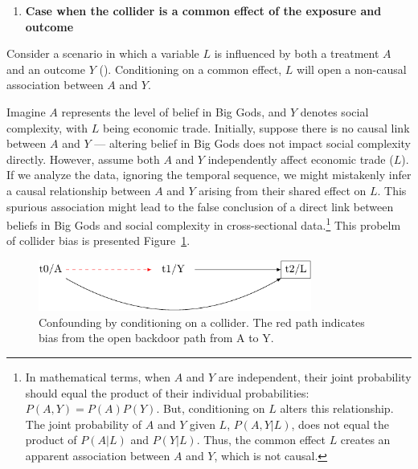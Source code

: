 \documentclass[
  singlecolumn,
  9pt]{article}
\providecommand{\tightlist}{%
  \setlength{\itemsep}{0pt}\setlength{\parskip}{0pt}}\usepackage{longtable,booktabs,array}
\begin{document}
\begin{enumerate}
\def\labelenumi{\arabic{enumi}.}
\tightlist
\item
  \textbf{Case when the collider is a common effect of the exposure and
  outcome}
\end{enumerate}

Consider a scenario in which a variable \(L\) is influenced by both a
treatment \(A\) and an outcome \(Y\) (). Conditioning on a common effect, \(L\) will open a
non-causal association between \(A\) and \(Y\).

Imagine \(A\) represents the level of belief in Big Gods, and \(Y\)
denotes social complexity, with \(L\) being economic trade. Initially,
suppose there is no causal link between \(A\) and \(Y\) --- altering
belief in Big Gods does not impact social complexity directly. However,
assume both \(A\) and \(Y\) independently affect economic trade (\(L\)).
If we analyze the data, ignoring the temporal sequence, we might
mistakenly infer a causal relationship between \(A\) and \(Y\) arising
from their shared effect on \(L\). This spurious association might lead
to the false conclusion of a direct link between beliefs in Big Gods and
social complexity in cross-sectional data.\footnote{In mathematical
  terms, when \(A\) and \(Y\) are independent, their joint probability
  should equal the product of their individual probabilities:
  \(P(A, Y) = P(A)P(Y)\). But, conditioning on \(L\) alters this
  relationship. The joint probability of \(A\) and \(Y\) given \(L\),
  \(P(A, Y | L)\), does not equal the product of \(P(A | L)\) and
  \(P(Y | L)\). Thus, the common effect \(L\) creates an apparent
  association between \(A\) and \(Y\), which is not causal.} This
probelm of collider bias is presented
Figure~\ref{fig-dag-common-effect}.

\begin{figure}

{\centering \includegraphics[width=0.8\textwidth,height=\textheight]{causal-dags_files/figure-pdf/fig-dag-common-effect-1.pdf}

}

\caption{\label{fig-dag-common-effect}Confounding by conditioning on a
collider. The red path indicates bias from the open backdoor path from A
to Y.}

\end{figure}
\end{document}

